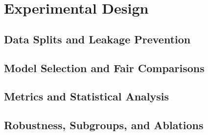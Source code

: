 \chapter{Experimental Design}
\label{ch:experimental-design}

\section{Data Splits and Leakage Prevention}

\section{Model Selection and Fair Comparisons}

\section{Metrics and Statistical Analysis}

\section{Robustness, Subgroups, and Ablations}
